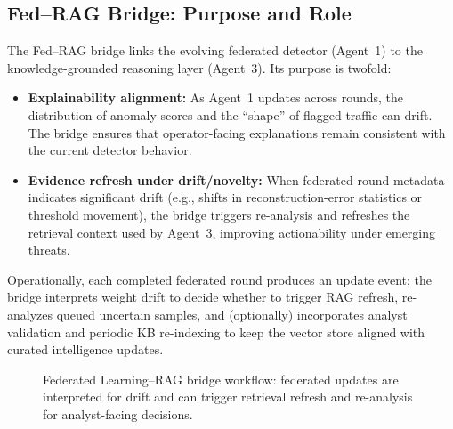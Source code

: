 \documentclass[conference]{IEEEtran}
\begin{document}
\subsection{Fed--RAG Bridge: Purpose and Role}
The Fed--RAG bridge links the evolving federated detector (Agent~1) to the knowledge-grounded reasoning layer (Agent~3). Its purpose is twofold:
\begin{itemize}
  \item \textbf{Explainability alignment:} As Agent~1 updates across rounds, the distribution of anomaly scores and the ``shape'' of flagged traffic can drift. The bridge ensures that operator-facing explanations remain consistent with the current detector behavior.
  \item \textbf{Evidence refresh under drift/novelty:} When federated-round metadata indicates significant drift (e.g., shifts in reconstruction-error statistics or threshold movement), the bridge triggers re-analysis and refreshes the retrieval context used by Agent~3, improving actionability under emerging threats.
\end{itemize}

Operationally, each completed federated round produces an update event; the bridge interprets weight drift to decide whether to trigger RAG refresh, re-analyzes queued uncertain samples, and (optionally) incorporates analyst validation and periodic KB re-indexing to keep the vector store aligned with curated intelligence updates.

\begin{figure}[t]
\centering
{}
\caption{Federated Learning--RAG bridge workflow: federated updates are interpreted for drift and can trigger retrieval refresh and re-analysis for analyst-facing decisions.}
\label{fig:fed_rag_workflow}
\end{figure}
\end{document}
